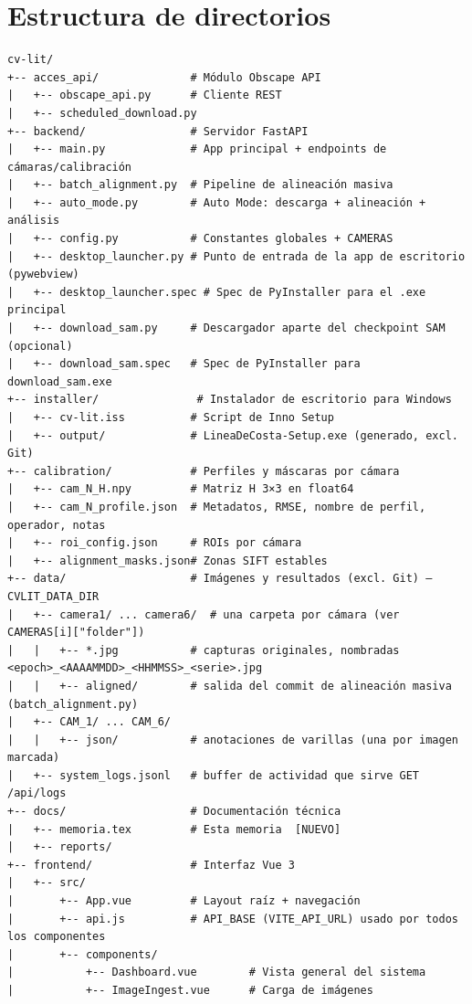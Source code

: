 \newpage
\section{Estructura de directorios}

\begin{codebox}
\begin{verbatim}
cv-lit/
+-- acces_api/              # Módulo Obscape API
|   +-- obscape_api.py      # Cliente REST
|   +-- scheduled_download.py
+-- backend/                # Servidor FastAPI
|   +-- main.py             # App principal + endpoints de cámaras/calibración
|   +-- batch_alignment.py  # Pipeline de alineación masiva
|   +-- auto_mode.py        # Auto Mode: descarga + alineación + análisis
|   +-- config.py           # Constantes globales + CAMERAS
|   +-- desktop_launcher.py # Punto de entrada de la app de escritorio (pywebview)
|   +-- desktop_launcher.spec # Spec de PyInstaller para el .exe principal
|   +-- download_sam.py     # Descargador aparte del checkpoint SAM (opcional)
|   +-- download_sam.spec   # Spec de PyInstaller para download_sam.exe
+-- installer/               # Instalador de escritorio para Windows
|   +-- cv-lit.iss          # Script de Inno Setup
|   +-- output/             # LineaDeCosta-Setup.exe (generado, excl. Git)
+-- calibration/            # Perfiles y máscaras por cámara
|   +-- cam_N_H.npy         # Matriz H 3×3 en float64
|   +-- cam_N_profile.json  # Metadatos, RMSE, nombre de perfil, operador, notas
|   +-- roi_config.json     # ROIs por cámara
|   +-- alignment_masks.json# Zonas SIFT estables
+-- data/                   # Imágenes y resultados (excl. Git) — CVLIT_DATA_DIR
|   +-- camera1/ ... camera6/  # una carpeta por cámara (ver CAMERAS[i]["folder"])
|   |   +-- *.jpg           # capturas originales, nombradas <epoch>_<AAAAMMDD>_<HHMMSS>_<serie>.jpg
|   |   +-- aligned/        # salida del commit de alineación masiva (batch_alignment.py)
|   +-- CAM_1/ ... CAM_6/
|   |   +-- json/           # anotaciones de varillas (una por imagen marcada)
|   +-- system_logs.jsonl   # buffer de actividad que sirve GET /api/logs
+-- docs/                   # Documentación técnica
|   +-- memoria.tex         # Esta memoria  [NUEVO]
|   +-- reports/
+-- frontend/               # Interfaz Vue 3
|   +-- src/
|       +-- App.vue         # Layout raíz + navegación
|       +-- api.js          # API_BASE (VITE_API_URL) usado por todos los componentes
|       +-- components/
|           +-- Dashboard.vue        # Vista general del sistema
|           +-- ImageIngest.vue      # Carga de imágenes

\end{verbatim}
\end{codebox}

